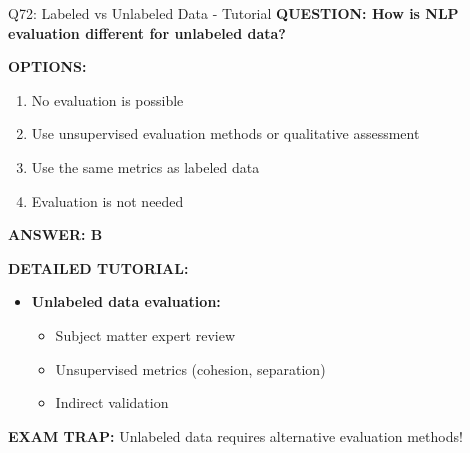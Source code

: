 \documentclass[8pt]{beamer}
\begin{document}
	\begin{frame}{Q72: Labeled vs Unlabeled Data - Tutorial}
		\fontsize{6.5}{7.5}\selectfont
		\textbf{QUESTION: How is NLP evaluation different for unlabeled data?}
		
		\vspace{0.1cm}
		\textbf{OPTIONS:}
		\begin{enumerate}
			\item No evaluation is possible
			\item Use unsupervised evaluation methods or qualitative assessment
			\item Use the same metrics as labeled data
			\item Evaluation is not needed
		\end{enumerate}
		
		\vspace{0.1cm}
		\textcolor{myblue}{\textbf{ANSWER: B}}
		
		\vspace{0.1cm}
		\textbf{DETAILED TUTORIAL:}
		\begin{itemize}
			\item \textbf{Unlabeled data evaluation:}
			\begin{itemize}
				\item Subject matter expert review
				\item Unsupervised metrics (cohesion, separation)
				\item Indirect validation
			\end{itemize}
		\end{itemize}
		
		\textcolor{myred}{\textbf{EXAM TRAP:}} Unlabeled data requires \textcolor{myblue}{alternative evaluation methods}!
	\end{frame}
	
\end{document}
